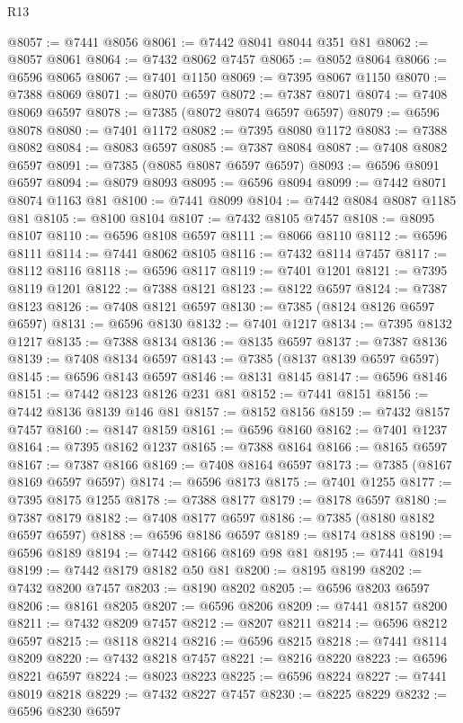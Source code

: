 \begin{lexlean}{R13}
\begin{coremodule}
@8057 := @7441 @8056
@8061 := @7442 @8041 @8044 @351 @81
@8062 := @8057 @8061
@8064 := @7432 @8062 @7457
@8065 := @8052 @8064
@8066 := @6596 @8065
@8067 := @7401 @1150
@8069 := @7395 @8067 @1150
@8070 := @7388 @8069
@8071 := @8070 @6597
@8072 := @7387 @8071
@8074 := @7408 @8069 @6597
@8078 := @7385 (@8072 @8074 @6597 @6597)
@8079 := @6596 @8078
@8080 := @7401 @1172
@8082 := @7395 @8080 @1172
@8083 := @7388 @8082
@8084 := @8083 @6597
@8085 := @7387 @8084
@8087 := @7408 @8082 @6597
@8091 := @7385 (@8085 @8087 @6597 @6597)
@8093 := @6596 @8091 @6597
@8094 := @8079 @8093
@8095 := @6596 @8094
@8099 := @7442 @8071 @8074 @1163 @81
@8100 := @7441 @8099
@8104 := @7442 @8084 @8087 @1185 @81
@8105 := @8100 @8104
@8107 := @7432 @8105 @7457
@8108 := @8095 @8107
@8110 := @6596 @8108 @6597
@8111 := @8066 @8110
@8112 := @6596 @8111
@8114 := @7441 @8062 @8105
@8116 := @7432 @8114 @7457
@8117 := @8112 @8116
@8118 := @6596 @8117
@8119 := @7401 @1201
@8121 := @7395 @8119 @1201
@8122 := @7388 @8121
@8123 := @8122 @6597
@8124 := @7387 @8123
@8126 := @7408 @8121 @6597
@8130 := @7385 (@8124 @8126 @6597 @6597)
@8131 := @6596 @8130
@8132 := @7401 @1217
@8134 := @7395 @8132 @1217
@8135 := @7388 @8134
@8136 := @8135 @6597
@8137 := @7387 @8136
@8139 := @7408 @8134 @6597
@8143 := @7385 (@8137 @8139 @6597 @6597)
@8145 := @6596 @8143 @6597
@8146 := @8131 @8145
@8147 := @6596 @8146
@8151 := @7442 @8123 @8126 @231 @81
@8152 := @7441 @8151
@8156 := @7442 @8136 @8139 @146 @81
@8157 := @8152 @8156
@8159 := @7432 @8157 @7457
@8160 := @8147 @8159
@8161 := @6596 @8160
@8162 := @7401 @1237
@8164 := @7395 @8162 @1237
@8165 := @7388 @8164
@8166 := @8165 @6597
@8167 := @7387 @8166
@8169 := @7408 @8164 @6597
@8173 := @7385 (@8167 @8169 @6597 @6597)
@8174 := @6596 @8173
@8175 := @7401 @1255
@8177 := @7395 @8175 @1255
@8178 := @7388 @8177
@8179 := @8178 @6597
@8180 := @7387 @8179
@8182 := @7408 @8177 @6597
@8186 := @7385 (@8180 @8182 @6597 @6597)
@8188 := @6596 @8186 @6597
@8189 := @8174 @8188
@8190 := @6596 @8189
@8194 := @7442 @8166 @8169 @98 @81
@8195 := @7441 @8194
@8199 := @7442 @8179 @8182 @50 @81
@8200 := @8195 @8199
@8202 := @7432 @8200 @7457
@8203 := @8190 @8202
@8205 := @6596 @8203 @6597
@8206 := @8161 @8205
@8207 := @6596 @8206
@8209 := @7441 @8157 @8200
@8211 := @7432 @8209 @7457
@8212 := @8207 @8211
@8214 := @6596 @8212 @6597
@8215 := @8118 @8214
@8216 := @6596 @8215
@8218 := @7441 @8114 @8209
@8220 := @7432 @8218 @7457
@8221 := @8216 @8220
@8223 := @6596 @8221 @6597
@8224 := @8023 @8223
@8225 := @6596 @8224
@8227 := @7441 @8019 @8218
@8229 := @7432 @8227 @7457
@8230 := @8225 @8229
@8232 := @6596 @8230 @6597

\end{coremodule}
\end{lexlean}
